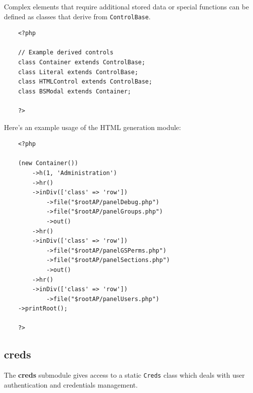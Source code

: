 \documentclass[12pt]{report}
\renewcommand\emph{\textbf}
\begin{document}
                    Complex elements that require additional stored data or special functions can be defined as classes that derive from \texttt{ControlBase}.

                    \begin{verbatim}
    <?php

    // Example derived controls
    class Container extends ControlBase;
    class Literal extends ControlBase;
    class HTMLControl extends ControlBase;
    class BSModal extends Container;

    ?>
                    \end{verbatim}               

                    Here's an example usage of the HTML generation module:

                    \begin{verbatim}
    <?php 

    (new Container())
        ->h(1, 'Administration')
        ->hr()
        ->inDiv(['class' => 'row'])
            ->file("$rootAP/panelDebug.php")
            ->file("$rootAP/panelGroups.php")
            ->out()
        ->hr()
        ->inDiv(['class' => 'row'])
            ->file("$rootAP/panelGSPerms.php")
            ->file("$rootAP/panelSections.php")
            ->out()
        ->hr()
        ->inDiv(['class' => 'row'])
            ->file("$rootAP/panelUsers.php")
    ->printRoot();

    ?>
                    \end{verbatim}           

                \subsection{creds}

                    The \emph{creds} submodule gives access to a static \texttt{Creds} class which deals with user authentication and credentials management.
\end{document}
